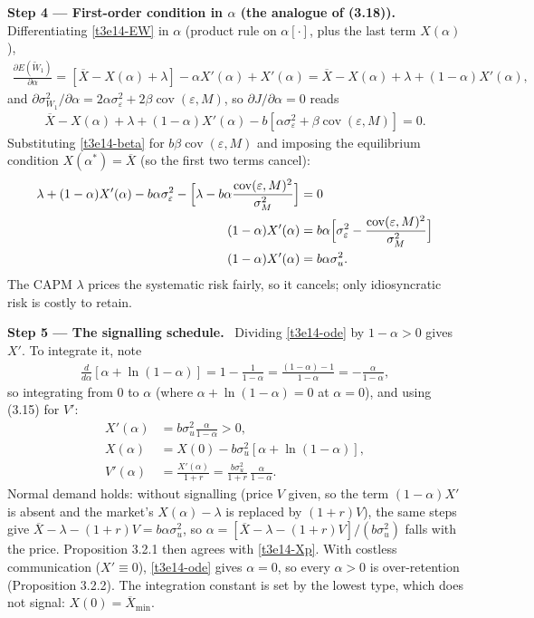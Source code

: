 \documentclass[11pt,a4paper]{article}
\newcommand{\step}[2]{\par\medskip\noindent\textbf{Step #1 --- #2.}~}
\begin{document}
\step{4}{First-order condition in $\alpha$ (the analogue of (3.18))} Differentiating \eqref{t3e14-EW} in $\alpha$ (product rule on $\alpha[\cdot]$, plus the last term $X(\alpha)$),
\begin{align}
  \frac{\partial E(\widetilde W_1)}{\partial\alpha} = [\overline X-X(\alpha)+\lambda]-\alpha X'(\alpha)+X'(\alpha) = \overline X-X(\alpha)+\lambda+(1-\alpha)X'(\alpha), \nonumber
\end{align}
and $\partial\sigma^2_{W_1}/\partial\alpha=2\alpha\sigma_\varepsilon^2+2\beta\operatorname{cov}(\varepsilon,M)$, so $\partial J/\partial\alpha=0$ reads
\begin{align}
  \overline X-X(\alpha)+\lambda+(1-\alpha)X'(\alpha)-b[\alpha\sigma_\varepsilon^2+\beta\operatorname{cov}(\varepsilon,M)] = 0. \nonumber
\end{align}
Substituting \eqref{t3e14-beta} for $b\beta\operatorname{cov}(\varepsilon,M)$ and imposing the equilibrium condition $X(\alpha^*)=\overline X$ (so the first two terms cancel):
\begin{align}
  \lambda+(1-\alpha)X'(\alpha)-b\alpha\sigma_\varepsilon^2-\Bigl[\lambda-b\alpha\frac{\operatorname{cov}(\varepsilon,M)^2}{\sigma_M^2}\Bigr] &= 0 \nonumber\\
  (1-\alpha)X'(\alpha) &= b\alpha\Bigl[\sigma_\varepsilon^2-\frac{\operatorname{cov}(\varepsilon,M)^2}{\sigma_M^2}\Bigr] \nonumber\\
  (1-\alpha)X'(\alpha) &= b\alpha\sigma_u^2. \label{t3e14-ode}
\end{align}
The CAPM $\lambda$ prices the systematic risk fairly, so it cancels; only idiosyncratic risk is costly to
retain.

\step{5}{The signalling schedule} Dividing \eqref{t3e14-ode} by $1-\alpha>0$ gives $X'$. To integrate it, note
\begin{align}
  \frac{d}{d\alpha}[\alpha+\ln(1-\alpha)] = 1-\frac{1}{1-\alpha} = \frac{(1-\alpha)-1}{1-\alpha} = -\frac{\alpha}{1-\alpha}, \nonumber
\end{align}
so integrating from 0 to $\alpha$ (where $\alpha+\ln(1-\alpha)=0$ at $\alpha=0$), and using (3.15) for $V'$:
\begin{align}
  X'(\alpha) &= b\sigma_u^2\frac{\alpha}{1-\alpha} > 0, \label{t3e14-Xp}\\
  X(\alpha) &= X(0)-b\sigma_u^2[\alpha+\ln(1-\alpha)], \label{t3e14-X}\\
  V'(\alpha) &= \frac{X'(\alpha)}{1+r} = \frac{b\sigma_u^2}{1+r}\,\frac{\alpha}{1-\alpha}. \label{t3e14-Vp}
\end{align}
Normal demand holds: without signalling (price $V$ given, so the term $(1-\alpha)X'$ is absent and the market's $X(\alpha)-\lambda$ is replaced by $(1+r)V$), the same steps give
$\overline X-\lambda-(1+r)V=b\alpha\sigma_u^2$, so $\alpha=[\overline X-\lambda-(1+r)V]/(b\sigma_u^2)$ falls
with the price. Proposition 3.2.1 then agrees with \eqref{t3e14-Xp}. With costless communication
($X'\equiv0$), \eqref{t3e14-ode} gives $\alpha=0$, so every $\alpha>0$ is over-retention (Proposition 3.2.2).
The integration constant is set by the lowest type, which does not signal: $X(0)=\overline X_{\min}$.
\end{document}
